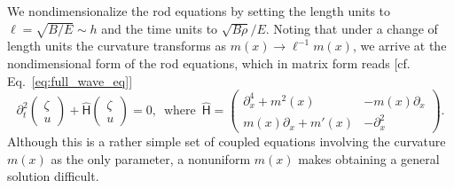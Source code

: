 We nondimensionalize the rod equations by setting the length units to $\ell = \sqrt{B/E} \sim h$ and the time units to $\sqrt{B\rho}/E$.
Noting that under a change of length units the curvature transforms as $m(x) \to \ell^{-1}m(x)$, we arrive at the nondimensional form of the rod equations, which in matrix form reads [cf. Eq.~\eqref{eq:full_wave_eq}]
%
\begin{equation}
\partial_{t}^{2}
\begin{pmatrix}
  \zeta\\
  u
\end{pmatrix} +
\widehat{\mathsf{H}}
\begin{pmatrix}
  \zeta\\
  u
\end{pmatrix} = 0,
\enspace
\text{where}
\enspace
\widehat{\mathsf{H}}
=
\begin{pmatrix}
  \partial^{4}_{x} + m^{2}(x) & -m(x)\partial_{x}\\
  m(x)\partial_{x} + m'(x) & -\partial^{2}_{x}
\end{pmatrix}.
\label{eq:rod}
\end{equation}
%
Although this is a rather simple set of coupled equations involving the curvature $m(x)$ as the only parameter, a nonuniform $m(x)$ makes obtaining a general solution difficult.

